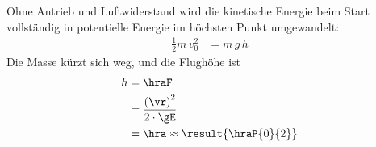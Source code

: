 Ohne Antrieb und Luftwiderstand wird die kinetische Energie beim Start vollständig in potentielle Energie im höchsten Punkt umgewandelt:
\begin{align}
 \frac{1}{2}m\,v_0^2 &= m\,g\,h
\end{align}
Die Masse kürzt sich weg, und die Flughöhe ist
\begin{align}
 h &= \hraF \\
   &= \frac{\left(\vr\right)^2}{2\cdot\gE} \\
   &= \hra \approx \result{\hraP{0}{2}}
\end{align}
